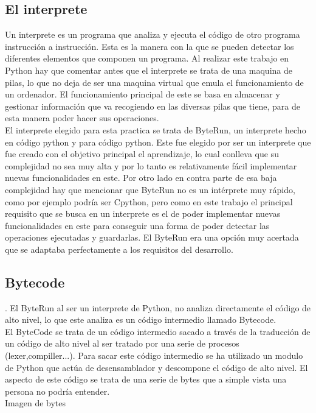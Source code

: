 \subsection{El interprete}

Un interprete es un programa que analiza y ejecuta el código de otro programa instrucción a instrucción. Esta es la manera con la que se pueden detectar los diferentes elementos que componen un programa. Al realizar este trabajo en Python hay que comentar antes que el interprete se trata de una maquina de pilas, lo que no deja de ser una maquina virtual que emula el funcionamiento de un ordenador. El funcionamiento principal de este se basa en almacenar y gestionar información que va recogiendo en las diversas pilas que tiene, para de esta manera poder hacer sus operaciones.\\
El interprete elegido para esta practica se trata de ByteRun, un interprete hecho en código python y para código python. Este fue elegido por ser un interprete que fue creado con el objetivo principal el aprendizaje, lo cual conlleva que su complejidad no sea muy alta y por lo tanto es relativamente fácil implementar nuevas funcionalidades en este. Por otro lado en contra parte de esa baja complejidad hay que mencionar que ByteRun no es un intérprete muy rápido, como por ejemplo podría ser Cpython, pero como en este trabajo el principal requisito que se busca en un interprete es el de poder implementar nuevas funcionalidades en este para conseguir una forma de poder detectar las operaciones ejecutadas y guardarlas. El ByteRun era una opción muy acertada que se adaptaba perfectamente a los requisitos del desarrollo.


\subsection{Bytecode}.
El ByteRun al ser un interprete de Python, no analiza directamente el código de alto nivel, lo que este analiza es un código intermedio llamado Bytecode.\\ El ByteCode se trata de un código intermedio sacado a través de la traducción de un código de alto nivel al ser tratado por una serie de procesos (lexer,compiller...). Para sacar este código intermedio se ha utilizado un modulo de Python que  actúa de desensamblador y descompone el código de alto nivel. El aspecto  de  este código se trata de una serie de bytes que a simple vista una persona no podría entender.\\

Imagen de bytes\\

